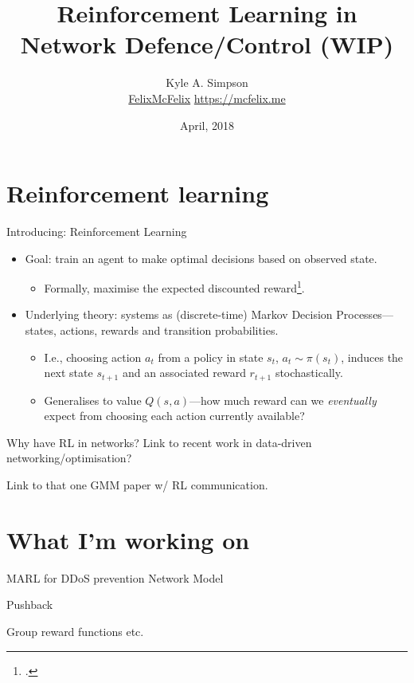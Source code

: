 \documentclass[aspectratio=169,xcolor={dvipsnames}
,hide notes
]{beamer}
\title{Reinforcement Learning in Network Defence/Control (WIP)}
\author{Kyle A. Simpson\\
	\small{\faGithub{} \href{https://github.com/felixmcfelix}{FelixMcFelix} \hspace{0.5em} \faGlobe{} \url{https://mcfelix.me}}}
\institute{University of Glasgow}
\date{\nth{10} April, 2018}
\begin{document}
\maketitle

\section{Reinforcement learning}

\begin{frame}{Introducing: Reinforcement Learning}
	\begin{itemize}
		\item Goal: train an agent to make optimal decisions based on observed state.
		\begin{itemize}
			\item Formally, maximise the \alert{expected discounted reward}\footcite{RL2E}.
		\end{itemize}
	
		\item Underlying theory: systems as (discrete-time) \alert{Markov Decision Processes}---states, actions, rewards and transition probabilities.
		\begin{itemize}
			\item I.e., choosing action $a_t$ from a policy in state $s_t$, $a_t \sim \pi(s_t)$, induces the next state $s_{t+1}$ and an associated reward $r_{t+1}$ stochastically.
			\item Generalises to \alert{value} $Q(s,a)$---how much reward can we \emph{eventually} expect from choosing each action currently available?
		\end{itemize}
	\end{itemize}
\end{frame}

\begin{frame}{Why have RL in networks?}
	Link to recent work in data-driven networking/optimisation?
	
	Link to that one GMM paper w/ RL communication.
\end{frame}

\section{What I'm working on}

\begin{frame}{MARL for DDoS prevention}
	Network Model
	
	Pushback
	
	Group reward functions etc.
\end{frame}
\end{document}
